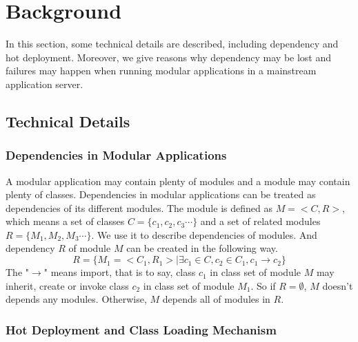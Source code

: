 \documentclass[conference]{IEEEtran}
\begin{document}
\section{Background\label{sec:background}}
In this section, some technical details are described, including dependency and hot deployment.
Moreover, we give reasons why dependency may be lost and failures may happen when running modular applications in a mainstream application server.

\subsection{Technical Details}

\subsubsection{Dependencies in Modular Applications} 

A modular application may contain plenty of modules and a module may contain plenty of classes.
Dependencies in modular applications can be treated as dependencies of its different modules.
The module is defined as $M=<C, R>$, which means a set of classes $C=\{c_1, c_2, c_3\cdots\}$ and a set of related modules $R=\{M_1, M_2, M_3\cdots\}$.
We use it to describe dependencies of modules.
And dependency $R$ of module $M$ can be created in the following way.
$$R=\{M_1=<C_1, R_1> \mid \exists c_1 \in C, c_2 \in C_1, c_1 \rightarrow c_2\}$$
The "$\rightarrow$" means import, that is to say, class $c_1$ in class set of module $M$ may inherit, create or invoke class $c_2$ in class set of module $M_1$. 
So if $R=\emptyset$, $M$ doesn't depends any modules.
Otherwise, $M$ depends all of modules in $R$.

\subsubsection{Hot Deployment and Class Loading Mechanism}
\end{document}
